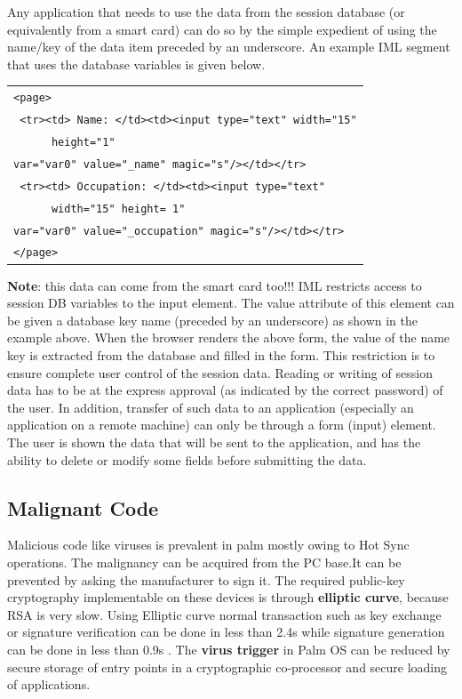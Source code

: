 \documentclass[11pt]{article}
\begin{document}
Any application that needs to use the data from the session database (or equivalently from a smart card) can do so by the simple expedient of using the name/key of the data item preceded by an underscore. An example IML segment that uses the database variables is given below.\\
\begin{center}
\begin{tabular}{|l|}
\hline
    \verb+<page>+\\
    \verb+ <tr><td> Name: </td><td><input type="text" width="15"+\\
    \verb+		height="1"+\\
    \verb+var="var0" value="_name" magic="s"/></td></tr>+\\
    \verb+ <tr><td> Occupation: </td><td><input type="text" +\\
    \verb+		width="15" height= 1"+\\
    \verb+var="var0" value="_occupation" magic="s"/></td></tr>+\\
    \verb+</page>+\\
\hline
\end{tabular}
\end{center}

{\bf Note}: this data can come from the smart card too!!!
IML restricts access to session DB variables to the input element. The value attribute of this element can be given a database key name (preceded by an underscore) as shown in the example above. When the browser renders the above form, the value of the name key is extracted from the database and filled in the form. 
This restriction is to ensure complete user control of the session data. Reading or writing of session data has to be at the express approval (as indicated by the correct password) of the user. In addition, transfer of such data to an application (especially an application on a remote machine) can only be through a form (input) element. The user is shown the data that will be sent to the application, and has the ability to delete or modify some fields before submitting the data.

\subsection{Malignant Code}

Malicious code like viruses is prevalent in palm mostly owing to Hot Sync operations. The malignancy can be acquired from the PC base.It can be prevented by asking the manufacturer to sign it. The required public-key cryptography implementable on these devices is through { \bf elliptic curve}, because RSA is very slow. Using Elliptic curve normal transaction such as key exchange or signature verification can be done in less than 2.4s while signature generation can be done in less than 0.9s \cite{elliptic}. The {\bf virus trigger} in Palm OS can be reduced by secure storage of entry points in a cryptographic co-processor and secure loading of applications. 
\end{document}
